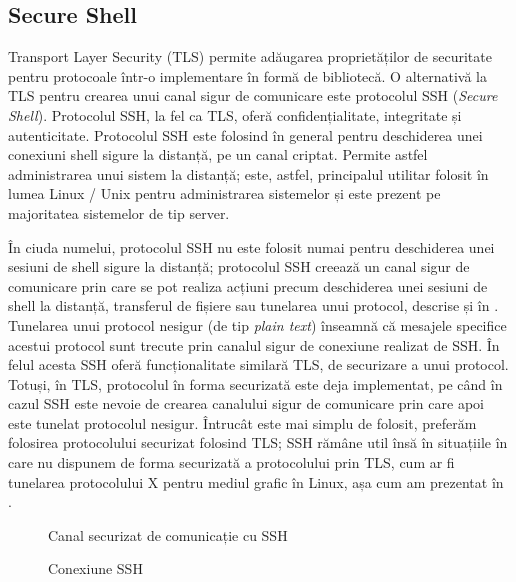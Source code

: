 \subsection{Secure Shell}
\label{sec:sec:transfer:ssh}

Transport Layer Security (TLS) permite adăugarea proprietăților de securitate pentru protocoale într-o implementare în formă de bibliotecă. O alternativă la TLS pentru crearea unui canal sigur de comunicare este protocolul SSH (\textit{Secure Shell}). Protocolul SSH, la fel ca TLS, oferă confidențialitate, integritate și autenticitate. Protocolul SSH este folosind în general pentru deschiderea unei conexiuni shell sigure la distanță, pe un canal criptat. Permite astfel administrarea unui sistem la distanță; este, astfel, principalul utilitar folosit în lumea Linux / Unix pentru administrarea sistemelor și este prezent pe majoritatea sistemelor de tip server.

În ciuda numelui, protocolul SSH nu este folosit numai pentru deschiderea unei sesiuni de shell sigure la distanță; protocolul SSH creează un canal sigur de comunicare prin care se pot realiza acțiuni precum deschiderea unei sesiuni de shell la distanță, transferul de fișiere sau tunelarea unui protocol, descrise și în . Tunelarea unui protocol nesigur (de tip \textit{plain text}) înseamnă că mesajele specifice acestui protocol sunt trecute prin canalul sigur de conexiune realizat de SSH. În felul acesta SSH oferă funcționalitate similară TLS, de securizare a unui protocol. Totuși, în TLS, protocolul în forma securizată este deja implementat, pe când în cazul SSH este nevoie de crearea canalului sigur de comunicare prin care apoi este tunelat protocolul nesigur. Întrucât este mai simplu de folosit, preferăm folosirea protocolului securizat folosind TLS; SSH rămâne util însă în situațiile în care nu dispunem de forma securizată a protocolului prin TLS, cum ar fi tunelarea protocolului X pentru mediul grafic în Linux, așa cum am prezentat în .

\begin{figure}[htbp]
  \centering
  \def\svgwidth{\columnwidth}
  
  \caption{Canal securizat de comunicație cu SSH}
  \label{fig:sec:ssh-channel}
\end{figure}

\begin{figure}[htbp]
  \centering
  \def\svgwidth{\columnwidth}
  
  \caption{Conexiune SSH}
  \label{fig:sec:ssh-session}
\end{figure}

